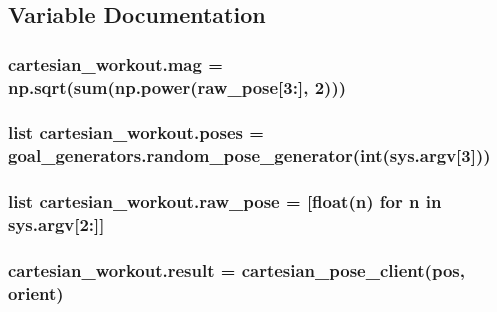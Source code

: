 \subsection{Variable Documentation}
\subsubsection[{\texorpdfstring{mag}{mag}}]{\setlength{\rightskip}{0pt plus 5cm}cartesian\+\_\+workout.\+mag = np.\+sqrt(sum(np.\+power({\bf raw\+\_\+pose}\mbox{[}3\+:\mbox{]}, 2)))}\hypertarget{namespacecartesian__workout_a9cc10da8ef79d18715644543b9794d80}{}\label{namespacecartesian__workout_a9cc10da8ef79d18715644543b9794d80}
\subsubsection[{\texorpdfstring{poses}{poses}}]{\setlength{\rightskip}{0pt plus 5cm}list cartesian\+\_\+workout.\+poses = {\bf goal\+\_\+generators.\+random\+\_\+pose\+\_\+generator}(int(sys.\+argv\mbox{[}3\mbox{]}))}\hypertarget{namespacecartesian__workout_ab293192d190a24c9cb8edbea4ef33862}{}\label{namespacecartesian__workout_ab293192d190a24c9cb8edbea4ef33862}
\subsubsection[{\texorpdfstring{raw\+\_\+pose}{raw_pose}}]{\setlength{\rightskip}{0pt plus 5cm}list cartesian\+\_\+workout.\+raw\+\_\+pose = \mbox{[}float(n) for n in sys.\+argv\mbox{[}2\+:\mbox{]}\mbox{]}}\hypertarget{namespacecartesian__workout_a967ea83284096aa4c94c0b41daa5df6c}{}\label{namespacecartesian__workout_a967ea83284096aa4c94c0b41daa5df6c}
\subsubsection[{\texorpdfstring{result}{result}}]{\setlength{\rightskip}{0pt plus 5cm}cartesian\+\_\+workout.\+result = {\bf cartesian\+\_\+pose\+\_\+client}(pos, orient)}\hypertarget{namespacecartesian__workout_ac2ac6ec3a92f53155c4912cbf5c93604}{}\label{namespacecartesian__workout_ac2ac6ec3a92f53155c4912cbf5c93604}

